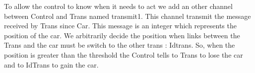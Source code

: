 \documentclass[11pt]{report}
\begin{document}
To allow the control to know when it needs to act we add an other channel between Control and Trans named transmit1. This channel transmit the message received by Trans since Car. This message is an integer which represents the position of the car. We arbitrarily decide the position when links between the Trans and the car must be switch to the other trans : Idtrans. So, when the position is greater than the threshold the Control tells to Trans to lose the car and to IdTrans to gain the car.
\end{document}
